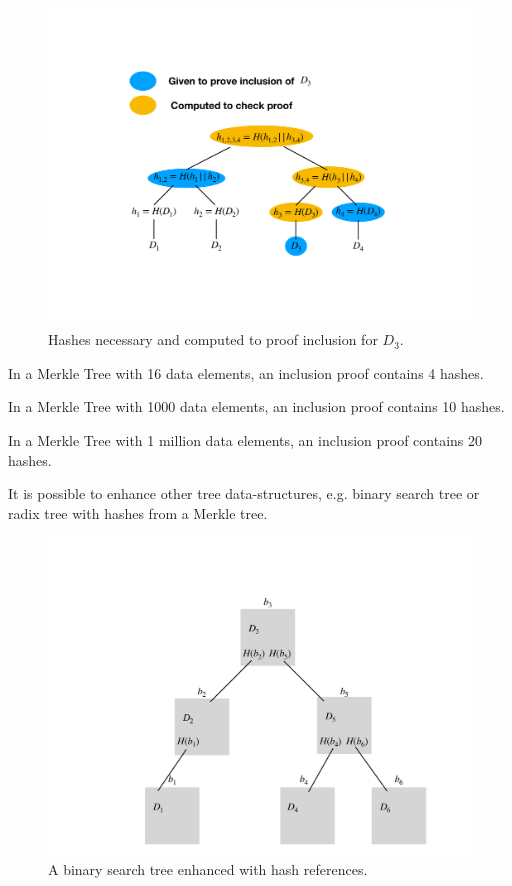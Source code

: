 \begin{figure}[ht]
	\includegraphics[width=\linewidth]{fig/merkleproof}
	\caption{Hashes necessary and computed to proof inclusion for $D_3$.}
\end{figure}


\begin{example}
	In a Merkle Tree with 16 data elements, an inclusion proof contains 4 hashes.
	
	In a Merkle Tree with 1000 data elements, an inclusion proof contains 10 hashes.
	
	In a Merkle Tree with 1 million data elements, an inclusion proof contains 20 hashes.
\end{example}


\begin{note}
It is possible to enhance other tree data-structures, e.g. binary search tree or radix tree with hashes from a Merkle tree.
\end{note}

\begin{figure}[ht]
	\includegraphics[width=\textwidth]{fig/binarySearchTree}
	\caption{A binary search tree enhanced with hash references.}
\end{figure}
